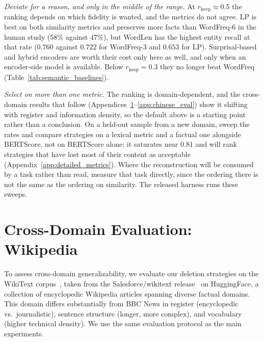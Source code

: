 \documentclass[11pt]{article}
\newcommand{\rkeep}{r_{\mathrm{keep}}}
\begin{document}
\emph{Deviate for a reason, and only in the middle of the range.} At $\rkeep \approx 0.5$ the ranking
depends on which fidelity is wanted, and the metrics do not agree. LP is best on both similarity metrics and
preserves more facts than WordFreq-6 in the human study ($58\%$ against $47\%$), but WordLen has the highest
entity recall at that rate ($0.760$ against $0.722$ for WordFreq-3 and $0.653$ for LP). Surprisal-based and
hybrid encoders are worth their cost only here as well, and only when an encoder-side model is available. Below $\rkeep = 0.3$ they no longer beat WordFreq (Table~\ref{tab:semantic_baselines}).

\emph{Select on more than one metric.} The ranking is domain-dependent, and the cross-domain results that
follow (Appendices~\ref{app:wikipedia_eval}--\ref{app:chinese_eval}) show it shifting with register and
information density, so the default above is a starting point rather than a conclusion. On a held-out sample
from a new domain, sweep the rates and compare strategies on a lexical metric and a factual one alongside
BERTScore, not on BERTScore alone: it saturates
near $0.81$ and will rank strategies that have lost most of their content as acceptable
(Appendix~\ref{app:detailed_metrics}). Where the reconstruction will be consumed by a task rather than read,
measure that task directly, since the ordering there is not the same as the ordering on similarity. The
released harness runs these sweeps.

\section{Cross-Domain Evaluation: Wikipedia}
\label{app:wikipedia_eval}

To assess cross-domain generalizability, we evaluate our deletion strategies on the
WikiText corpus~\citep{merity2016wikitext}, taken from the Salesforce/wikitext release~\citep{salesforce2022wikitext} on HuggingFace,
a collection of encyclopedic Wikipedia articles spanning diverse factual domains.
This domain differs substantially from BBC News in register (encyclopedic vs.\ journalistic),
sentence structure (longer, more complex), and vocabulary (higher technical density).
We use the same evaluation protocol as the main experiments.
\end{document}
